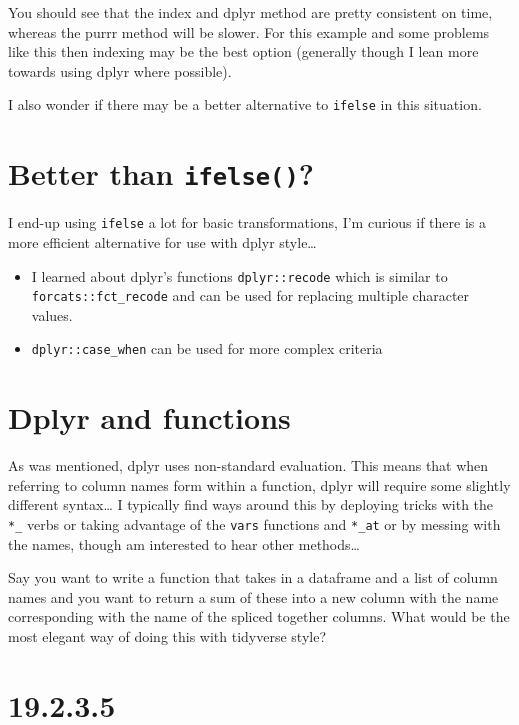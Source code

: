 \documentclass[]{book}
\providecommand{\tightlist}{%
  \setlength{\itemsep}{0pt}\setlength{\parskip}{0pt}}
\theoremstyle{definition}
\theoremstyle{definition}
\theoremstyle{definition}
\theoremstyle{remark}
\begin{document}
You should see that the index and dplyr method are pretty consistent on
time, whereas the purrr method will be slower. For this example and some
problems like this then indexing may be the best option (generally
though I lean more towards using dplyr where possible).

I also wonder if there may be a better alternative to \texttt{ifelse} in
this situation.

\hypertarget{better-than-ifelse}{%
\section{\texorpdfstring{Better than
\texttt{ifelse()}?}{Better than ifelse()?}}\label{better-than-ifelse}}

I end-up using \texttt{ifelse} a lot for basic transformations, I'm
curious if there is a more efficient alternative for use with dplyr
style\ldots{}

\begin{itemize}
\tightlist
\item
  I learned about dplyr's functions \texttt{dplyr::recode} which is
  similar to \texttt{forcats::fct\_recode} and can be used for replacing
  multiple character values.
\item
  \texttt{dplyr::case\_when} can be used for more complex criteria
\end{itemize}

\hypertarget{dplyr-and-functions}{%
\section{Dplyr and functions}\label{dplyr-and-functions}}

As was mentioned, dplyr uses non-standard evaluation. This means that
when referring to column names form within a function, dplyr will
require some slightly different syntax\ldots{} I typically find ways
around this by deploying tricks with the \texttt{*\_} verbs or taking
advantage of the \texttt{vars} functions and \texttt{*\_at} or by
messing with the names, though am interested to hear other
methods\ldots{}

Say you want to write a function that takes in a dataframe and a list of
column names and you want to return a sum of these into a new column
with the name corresponding with the name of the spliced together
columns. What would be the most elegant way of doing this with tidyverse
style?

\hypertarget{section-67}{%
\section{19.2.3.5}\label{section-67}}
\end{document}
